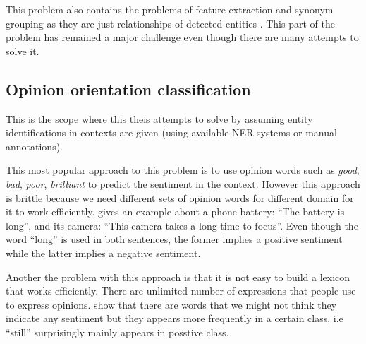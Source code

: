 \documentclass{article}
\begin{document}
\begin{multicols}{2}
    This problem also contains the problems of feature extraction and synonym
grouping as they are just relationships of detected entities
\cite{WebKnox2011}. This part of the problem has remained a major challenge
even though there are many attempts to solve it.


  \subsection{Opinion orientation classification}
    This is the scope where this theis attempts to solve by assuming 
entity identifications in contexts are given (using available NER systems or
manual annotations). 
    
    This most popular approach to this problem is to use opinion words
such as \textit{good}, \textit{bad}, \textit{poor}, \textit{brilliant} to
predict the sentiment in the context. However this approach is brittle because
we need different sets of opinion words for different domain for it to work
efficiently. \citet{Liu2010} gives an example about a phone battery: ``The
battery is long'', and its camera: ``This camera takes a long time to focus''.
Even though the word ``long'' is used in both sentences, the former implies a
positive sentiment while the latter implies a negative sentiment.

    Another the problem with this approach is that it is not easy to
build a lexicon that works efficiently. There are unlimited number of
expressions that people use to express opinions. \citet{Pang2002} show that
there are words that we might not think they indicate any sentiment but they
appears more frequently in a certain class, i.e ``still'' surprisingly mainly
appears in posstive class.


\end{multicols}
\end{document}
